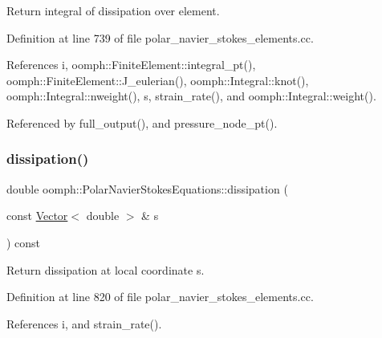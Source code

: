 Return integral of dissipation over element. 



Definition at line 739 of file polar\+\_\+navier\+\_\+stokes\+\_\+elements.\+cc.



References i, oomph\+::\+Finite\+Element\+::integral\+\_\+pt(), oomph\+::\+Finite\+Element\+::\+J\+\_\+eulerian(), oomph\+::\+Integral\+::knot(), oomph\+::\+Integral\+::nweight(), s, strain\+\_\+rate(), and oomph\+::\+Integral\+::weight().



Referenced by full\+\_\+output(), and pressure\+\_\+node\+\_\+pt().

\mbox{\label{classoomph_1_1PolarNavierStokesEquations_ae8db187877c291548f6249266a4f6341}} 
\subsubsection{\texorpdfstring{dissipation()}{dissipation()}\hspace{0.1cm}{\footnotesize\ttfamily [2/2]}}
{\footnotesize\ttfamily double oomph\+::\+Polar\+Navier\+Stokes\+Equations\+::dissipation (\begin{DoxyParamCaption}\item[{const \hyperlink{classoomph_1_1Vector}{Vector}$<$ double $>$ \&}]{s }\end{DoxyParamCaption}) const}



Return dissipation at local coordinate s. 



Definition at line 820 of file polar\+\_\+navier\+\_\+stokes\+\_\+elements.\+cc.



References i, and strain\+\_\+rate().

\mbox{\label{classoomph_1_1PolarNavierStokesEquations_a7fda7aac0b9eb09410dfff38f992374c}} 
